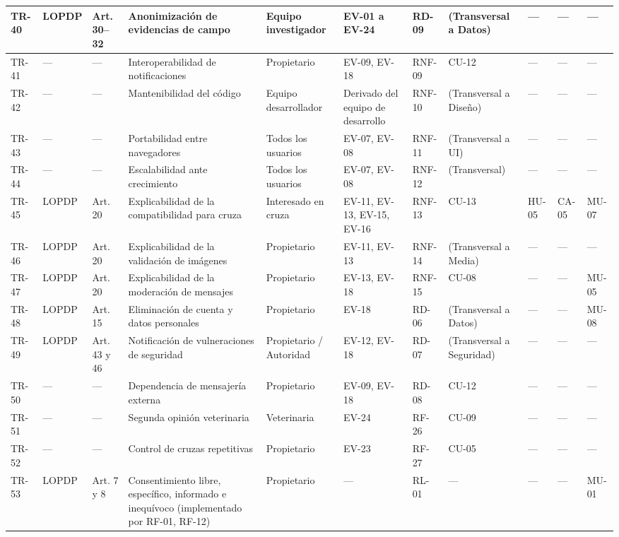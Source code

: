 \documentclass[journal,onecolumn]{IEEEtran}
\begin{document}
\begin{landscape}
\begin{longtable}{@{}p{0.8cm} p{1.3cm} p{1.5cm} p{2.2cm} p{1.5cm} p{1.8cm} p{1.6cm} p{1.3cm} p{1.3cm} p{1.3cm} p{1.5cm}@{}}
			TR-40 & LOPDP & Art. 30--32 & Anonimización de evidencias de campo & Equipo investigador & EV-01 a EV-24 & RD-09 & (Transversal a Datos) & --- & --- & --- \\ \midrule
			TR-41 & --- & --- & Interoperabilidad de notificaciones & Propietario & EV-09, EV-18 & RNF-09 & CU-12 & --- & --- & --- \\ \midrule
			TR-42 & --- & --- & Mantenibilidad del código & Equipo desarrollador & Derivado del equipo de desarrollo & RNF-10 & (Transversal a Diseño) & --- & --- & --- \\ \midrule
			TR-43 & --- & --- & Portabilidad entre navegadores & Todos los usuarios & EV-07, EV-08 & RNF-11 & (Transversal a UI) & --- & --- & --- \\ \midrule
			TR-44 & --- & --- & Escalabilidad ante crecimiento & Todos los usuarios & EV-07, EV-08 & RNF-12 & (Transversal) & --- & --- & --- \\ \midrule
			TR-45 & LOPDP & Art. 20 & Explicabilidad de la compatibilidad para cruza & Interesado en cruza & EV-11, EV-13, EV-15, EV-16 & RNF-13 & CU-13 & HU-05 & CA-05 & MU-07 \\ \midrule
			TR-46 & LOPDP & Art. 20 & Explicabilidad de la validación de imágenes & Propietario & EV-11, EV-13 & RNF-14 & (Transversal a Media) & --- & --- & --- \\ \midrule
			TR-47 & LOPDP & Art. 20 & Explicabilidad de la moderación de mensajes & Propietario & EV-13, EV-18 & RNF-15 & CU-08 & --- & --- & MU-05 \\ \midrule
			TR-48 & LOPDP & Art. 15 & Eliminación de cuenta y datos personales & Propietario & EV-18 & RD-06 & (Transversal a Datos) & --- & --- & MU-08 \\ \midrule
			TR-49 & LOPDP & Art. 43 y 46 & Notificación de vulneraciones de seguridad & Propietario / Autoridad & EV-12, EV-18 & RD-07 & (Transversal a Seguridad) & --- & --- & --- \\ \midrule
			TR-50 & --- & --- & Dependencia de mensajería externa & Propietario & EV-09, EV-18 & RD-08 & CU-12 & --- & --- & --- \\ \midrule
			TR-51 & --- & --- & Segunda opinión veterinaria & Veterinaria & EV-24 & RF-26 & CU-09 & --- & --- & --- \\ \midrule
			TR-52 & --- & --- & Control de cruzas repetitivas & Propietario & EV-23 & RF-27 & CU-05 & --- & --- & --- \\ \midrule
			TR-53 & LOPDP & Art. 7 y 8 & Consentimiento libre, específico, informado e inequívoco (implementado por RF-01, RF-12) & Propietario & --- & RL-01 & --- & --- & --- & MU-01 \\ \midrule

\end{longtable}
\end{landscape}
\end{document}
